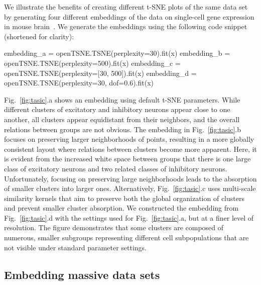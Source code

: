 \documentclass[article]{jss}
\begin{document}
We illustrate the benefits of creating different t-SNE plots of the same data set by generating four different embeddings of the data on single-cell gene expression in mouse brain~\citep{tasic2018shared}. We generate the embeddings using the following code snippet (shortened for clarity):
\begin{CodeChunk}
\begin{CodeInput}
embedding_a = openTSNE.TSNE(perplexity=30).fit(x)
embedding_b = openTSNE.TSNE(perplexity=500).fit(x)
embedding_c = openTSNE.TSNE(perplexity=[30, 500]).fit(x)
embedding_d = openTSNE.TSNE(perplexity=30, dof=0.6).fit(x)
\end{CodeInput}
\end{CodeChunk}
Fig.~\ref{fig:tasic}.a shows an embedding using default t-SNE parameters. While different clusters of excitatory and inhibitory neurons appear close to one another, all clusters appear equidistant from their neighbors, and the overall relations between groups are not obvious. The embedding in Fig.~\ref{fig:tasic}.b focuses on preserving larger neighborhoods of points, resulting in a more globally consistent layout where relations between clusters become more apparent. Here, it is evident from the increased white space between groups that there is one large class of excitatory neurons and two related classes of inhibitory neurons. Unfortunately, focusing on preserving large neighborhoods leads to the absorption of smaller clusters into larger ones. Alternatively, Fig.~\ref{fig:tasic}.c uses multi-scale similarity kernels that aim to preserve both the global organization of clusters and prevent smaller cluster absorption. We constructed the embedding from Fig.~\ref{fig:tasic}.d with the settings used for Fig.~\ref{fig:tasic}.a, but at a finer level of resolution. The figure demonstrates that some clusters are composed of numerous, smaller subgroups representing different cell subpopulations that are not visible under standard parameter settings.

\subsection{Embedding massive data sets}
\end{document}
